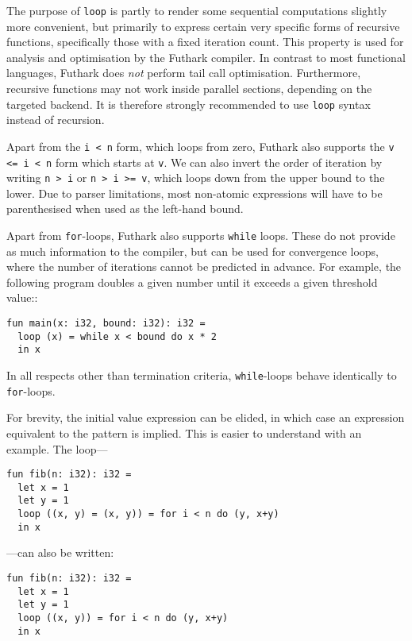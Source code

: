 \documentclass[oneside,11pt]{book}
\begin{document}
The purpose of \texttt{loop} is partly to render some sequential
computations slightly more convenient, but primarily to express
certain very specific forms of recursive functions, specifically those
with a fixed iteration count.  This property is used for analysis and
optimisation by the Futhark compiler.  In contrast to most functional
languages, Futhark does \textit{not} perform tail call optimisation.
Furthermore, recursive functions may not work inside parallel
sections, depending on the targeted backend.  It is therefore strongly
recommended to use \texttt{loop} syntax instead of recursion.

Apart from the \texttt{i < n} form, which loops from zero, Futhark
also supports the \texttt{v <= i < n} form which starts at \texttt{v}.
We can also invert the order of iteration by writing \texttt{n > i} or
\texttt{n > i >= v}, which loops down from the upper bound to the
lower.  Due to parser limitations, most non-atomic expressions will
have to be parenthesised when used as the left-hand bound.

Apart from \texttt{for}-loops, Futhark also supports \texttt{while}
loops.  These do not provide as much information to the compiler, but
can be used for convergence loops, where the number of iterations
cannot be predicted in advance.  For example, the following program
doubles a given number until it exceeds a given threshold value::

\begin{lstlisting}
fun main(x: i32, bound: i32): i32 =
  loop (x) = while x < bound do x * 2
  in x
\end{lstlisting}

In all respects other than termination criteria, \texttt{while}-loops
behave identically to \texttt{for}-loops.

For brevity, the initial value expression can be elided, in which case
an expression equivalent to the pattern is implied.  This is easier to
understand with an example.  The loop---

\begin{lstlisting}
fun fib(n: i32): i32 =
  let x = 1
  let y = 1
  loop ((x, y) = (x, y)) = for i < n do (y, x+y)
  in x
\end{lstlisting}

---can also be written:

\begin{lstlisting}
fun fib(n: i32): i32 =
  let x = 1
  let y = 1
  loop ((x, y)) = for i < n do (y, x+y)
  in x
\end{lstlisting}
\end{document}

